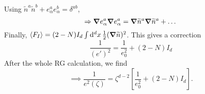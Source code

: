 Using $\widetilde{n}^{a} \widetilde{n}^{b} + e^{a}_{\alpha} e^{b}_{\alpha} = \delta^{ab}$,
\begin{equation}
  \Rightarrow \grad e^{a}_{\alpha} \grad e^{a}_{\alpha} = \grad \widetilde{n}^{a} \grad \widetilde{n}^{a} + \dots
\end{equation}
Finally, $\langle F_I \rangle = (2 -N) I_d \int \dd[d]{x} \frac{1}{2} (\grad \widetilde{n})^2$. This gives a correction
\begin{equation}
  \frac{1}{(e')^2} = \frac{1}{e_0^2} + (2-N) I_d
\end{equation}
After the whole RG calculation, we find
\begin{equation}
  \implies \frac{1}{e^2(\zeta)} = \zeta^{d-2} \left[ \frac{1}{e_0^2} + (2-N) I_d \right].
\end{equation}
